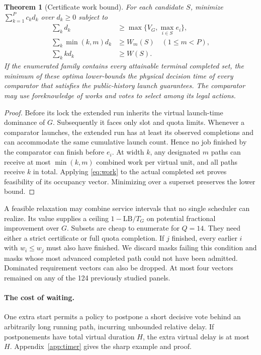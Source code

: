 \documentclass{article}
\newtheorem{theorem}{Theorem}
\begin{document}
\begin{theorem}[Certificate work bound]\label{th:floor}
For each candidate \(S\), minimize \(\sum_{k=1}^P c_k d_k\) over \(d_k\ge0\) subject to
\begin{align}
 \sum_k d_k &\ge \max\{V_G,\max_{i\in S}e_i\}, \nonumber\\
 \sum_k\min(k,m)d_k &\ge W_m(S) \quad (1\le m<P), \label{eq:lp}\\
 \sum_k k d_k &\ge W(S). \nonumber
\end{align}
If the enumerated family contains every attainable terminal completed set, the minimum of these optima lower-bounds the physical decision time of every comparator that satisfies the public-history launch guarantees. The comparator may use foreknowledge of works and votes to select among its legal actions.
\end{theorem}
\begin{proof}
Before its lock the extended run inherits the virtual launch-time dominance of \(G\). Subsequently it faces only slot and quota limits. Whenever a comparator launches, the extended run has at least its observed completions and can accommodate the same cumulative launch count. Hence no job finished by the comparator can finish before \(e_i\). At width \(k\), any designated \(m\) paths can receive at most \(\min(k,m)\) combined work per virtual unit, and all paths receive \(k\) in total. Applying \eqref{eq:work} to the actual completed set proves feasibility of its occupancy vector. Minimizing over a superset preserves the lower bound.
\end{proof}

A feasible relaxation may combine service intervals that no single scheduler can realize. Its value supplies a ceiling \(1-\mathrm{LB}/T_G\) on potential fractional improvement over \(G\). Subsets are cheap to enumerate for \(Q=14\). They need either a strict certificate or full quota completion. If \(j\) finished, every earlier \(i\) with \(w_i\le w_j\) must also have finished. We discard masks failing this condition and masks whose most advanced completed path could not have been admitted. Dominated requirement vectors can also be dropped. At most four vectors remained on any of the 124 previously studied panels.

\paragraph{The cost of waiting.} One extra start permits a policy to postpone a short decisive vote behind an arbitrarily long running path, incurring unbounded relative delay. If postponements have total virtual duration $H$, the extra virtual delay is at most $H$. Appendix~\ref{app:timer} gives the sharp example and proof.
\end{document}

